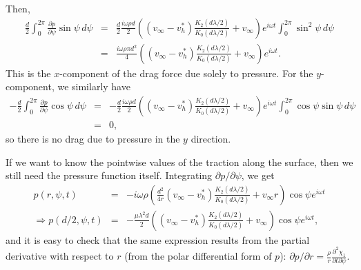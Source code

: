 \documentclass[11pt]{amsart}
\newcommand{\vinf}{v_{\infty}}
\newcommand{\om}{\omega}
\newcommand{\baa}[1]{\begin{eqnarray} #1 \end{eqnarray}}
\newcommand{\baas}[1]{\begin{eqnarray*} #1 \end{eqnarray*}}
\newcommand{\pd}[2]{\ensuremath{\frac{\partial #1}{\partial #2}}}
\newcommand{\pddd}[3]{\ensuremath{\frac{\partial^2 #1}{\partial #2 \partial #3}}}
\begin{document}
		
		Then, 
		\baas{
		\frac{d}{2}\int_0^{2\pi} \pd{p}{\psi} \sin\psi \, d\psi &=& \frac{d}{2}\frac{i \om \rho d}{2}\left((\vinf-v_h^*)\frac{K_2(d\lambda/2)}{K_0(d\lambda/2)} + \vinf \right) e^{i \om t}\int_0^{2\pi} \sin^2 \psi \,d\psi \\
		&=&  \frac{i \om \rho \pi d^2}{4}\left((\vinf-v_h^*)\frac{K_2(d\lambda/2)}{K_0(d\lambda/2)} + \vinf \right) e^{i \om t}.
		}
		This is the $x$-component of the drag force due solely to pressure. For the $y$-component, we similarly have
		\baas{
		-\frac{d}{2}\int_0^{2\pi} \pd{p}{\psi} \cos\psi \, d\psi &=& -\frac{d}{2}\frac{i \om \rho d}{2}\left((\vinf-v_h^*)\frac{K_2(d\lambda/2)}{K_0(d\lambda/2)} + \vinf \right) e^{i \om t}\int_0^{2\pi} \cos\psi \sin \psi \,d\psi \\
		&=& 0,
		}
		so there is no drag due to pressure in the $y$ direction.
		
		If we want to know the pointwise values of the traction along the surface, then we still need the pressure function itself. Integrating $\partial p/\partial \psi$, we get
		\baa{
		p(r,\psi,t) &=& -i\om\rho\left(\frac{d^2}{4r}(\vinf-v_h^*)\frac{K_2(d\lambda/2)}{K_0(d\lambda/2)} + \vinf r \right)\cos\psi e^{i\om t} \\
		\Rightarrow p(d/2,\psi,t) &=& -\frac{\mu \lambda^2 d}{2}\left( (\vinf-v_h^*)\frac{K_2(d\lambda/2)}{K_0(d\lambda/2)} + \vinf \right) \cos\psi e^{i\om t}, \label{eqn:pressure}
		}
		and it is easy to check that the same expression results from the partial derivative with respect to $r$ (from the polar differential form of $p$): $\partial p/\partial r = \frac{\rho}{r} \pddd{\chi_1}{t}{\psi}$.
		
\end{document}
